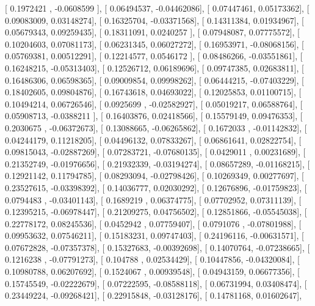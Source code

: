 \documentclass{article}
\begin{document}
       [ 0.1972421 , -0.0608599 ],
       [ 0.06494537, -0.04462086],
       [ 0.07447461,  0.05173362],
       [ 0.09083009,  0.03148274],
       [ 0.16325704, -0.03371568],
       [ 0.14311384,  0.01934967],
       [ 0.05679343,  0.09259435],
       [ 0.18311091,  0.0240257 ],
       [ 0.07948087,  0.07775572],
       [ 0.10204603,  0.07081173],
       [ 0.06231345,  0.06027272],
       [ 0.16953971, -0.08068156],
       [ 0.05769381,  0.00512291],
       [ 0.12214577,  0.0546172 ],
       [ 0.08486266, -0.03551861],
       [ 0.16248215, -0.05313403],
       [ 0.12526712,  0.06189696],
       [ 0.09747385,  0.02683811],
       [ 0.16486306,  0.06598365],
       [ 0.09009854,  0.09998262],
       [ 0.06444215, -0.07403229],
       [ 0.18402605,  0.09804876],
       [ 0.16743618,  0.04693022],
       [ 0.12025853,  0.01100715],
       [ 0.10494214,  0.06726546],
       [ 0.0925699 , -0.02582927],
       [ 0.05019217,  0.06588764],
       [ 0.05908713, -0.0388211 ],
       [ 0.16403876,  0.02418566],
       [ 0.15579149,  0.09476353],
       [ 0.2030675 , -0.06372673],
       [ 0.13088665, -0.06265862],
       [ 0.1672033 , -0.01142832],
       [ 0.04244179,  0.11218205],
       [ 0.04496132,  0.07833267],
       [ 0.06861641,  0.02822754],
       [ 0.09815043, -0.02887269],
       [ 0.07283721, -0.07680135],
       [ 0.0429011 ,  0.00231689],
       [ 0.21352749, -0.01976656],
       [ 0.21932339, -0.03194274],
       [ 0.08657289, -0.01168215],
       [ 0.12921142,  0.11794785],
       [ 0.08293094, -0.02798426],
       [ 0.10269349,  0.00277697],
       [ 0.23527615, -0.03398392],
       [ 0.14036777,  0.02030292],
       [ 0.12676896, -0.01759823],
       [ 0.0794483 , -0.03401143],
       [ 0.1689219 ,  0.06374775],
       [ 0.07702952,  0.07311139],
       [ 0.12395215, -0.06978447],
       [ 0.21209275,  0.04756502],
       [ 0.12851866, -0.05545038],
       [ 0.22778172,  0.08245536],
       [ 0.0452942 ,  0.07759407],
       [ 0.0791076 , -0.07801988],
       [ 0.09953632,  0.07546211],
       [ 0.15183231,  0.09747403],
       [ 0.24196116, -0.00631571],
       [ 0.07672828, -0.07357378],
       [ 0.15327683, -0.00392698],
       [ 0.14070764, -0.07238665],
       [ 0.1216238 , -0.07791273],
       [ 0.104788  ,  0.02534429],
       [ 0.10447856, -0.04320084],
       [ 0.10980788,  0.06207692],
       [ 0.1524067 ,  0.00939548],
       [ 0.04943159,  0.06677356],
       [ 0.15745549, -0.02222679],
       [ 0.07222595, -0.08588118],
       [ 0.06731994,  0.03408474],
       [ 0.23449224, -0.09268421],
       [ 0.22915848, -0.03128176],
       [ 0.14781168,  0.01602647],
\end{document}
